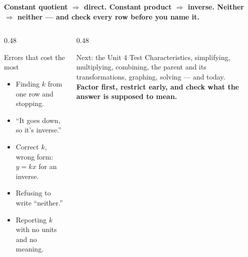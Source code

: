 \documentclass[aspectratio=169, 11pt]{beamer}
\begin{document}
\begin{frame}[t, plain]
  \begin{block}{}
    \centering\textbf{Constant quotient $\Rightarrow$ direct. Constant product $\Rightarrow$ inverse.
    Neither $\Rightarrow$ neither --- and check every row before you name it.}
  \end{block}
  \vspace{6pt}
  \begin{columns}[T]
    \begin{column}{0.48\textwidth}
      \begin{block}{Errors that cost the most}
        \begin{itemize}\setlength{\itemsep}{2pt}
          \item Finding $k$ from one row and stopping.
          \item ``It goes down, so it's inverse.''
          \item Correct $k$, wrong form: $y=kx$ for an inverse.
          \item Refusing to write ``neither.''
          \item Reporting $k$ with no units and no meaning.
        \end{itemize}
      \end{block}
    \end{column}
    \begin{column}{0.48\textwidth}
      \begin{block}{Next: the Unit 4 Test}
        Characteristics, simplifying, multiplying, combining, the parent and its transformations,
        graphing, solving --- and today. \\[3pt]
        \centering\textbf{Factor first, restrict early, and check what the answer is supposed to mean.}
      \end{block}
    \end{column}
  \end{columns}
\end{frame}
\end{document}
